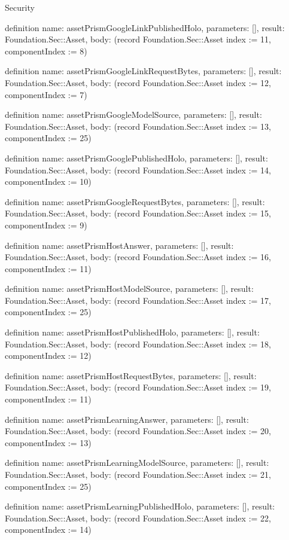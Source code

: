 \begin{lexlean}{Security}
\begin{semanticmodule}
definition{
  name: assetPrismGoogleLinkPublishedHolo,
  parameters: [],
  result: Foundation.Sec::Asset,
  body: (record Foundation.Sec::Asset {index := 11, componentIndex := 8})
}

definition{
  name: assetPrismGoogleLinkRequestBytes,
  parameters: [],
  result: Foundation.Sec::Asset,
  body: (record Foundation.Sec::Asset {index := 12, componentIndex := 7})
}

definition{
  name: assetPrismGoogleModelSource,
  parameters: [],
  result: Foundation.Sec::Asset,
  body: (record Foundation.Sec::Asset {index := 13, componentIndex := 25})
}

definition{
  name: assetPrismGooglePublishedHolo,
  parameters: [],
  result: Foundation.Sec::Asset,
  body: (record Foundation.Sec::Asset {index := 14, componentIndex := 10})
}

definition{
  name: assetPrismGoogleRequestBytes,
  parameters: [],
  result: Foundation.Sec::Asset,
  body: (record Foundation.Sec::Asset {index := 15, componentIndex := 9})
}

definition{
  name: assetPrismHostAnswer,
  parameters: [],
  result: Foundation.Sec::Asset,
  body: (record Foundation.Sec::Asset {index := 16, componentIndex := 11})
}

definition{
  name: assetPrismHostModelSource,
  parameters: [],
  result: Foundation.Sec::Asset,
  body: (record Foundation.Sec::Asset {index := 17, componentIndex := 25})
}

definition{
  name: assetPrismHostPublishedHolo,
  parameters: [],
  result: Foundation.Sec::Asset,
  body: (record Foundation.Sec::Asset {index := 18, componentIndex := 12})
}

definition{
  name: assetPrismHostRequestBytes,
  parameters: [],
  result: Foundation.Sec::Asset,
  body: (record Foundation.Sec::Asset {index := 19, componentIndex := 11})
}

definition{
  name: assetPrismLearningAnswer,
  parameters: [],
  result: Foundation.Sec::Asset,
  body: (record Foundation.Sec::Asset {index := 20, componentIndex := 13})
}

definition{
  name: assetPrismLearningModelSource,
  parameters: [],
  result: Foundation.Sec::Asset,
  body: (record Foundation.Sec::Asset {index := 21, componentIndex := 25})
}

definition{
  name: assetPrismLearningPublishedHolo,
  parameters: [],
  result: Foundation.Sec::Asset,
  body: (record Foundation.Sec::Asset {index := 22, componentIndex := 14})
}


\end{semanticmodule}
\end{lexlean}
